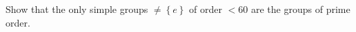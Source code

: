 \begin{problem}
  Show that the only simple groups \(\neq\left\{e\right\}\) of order
  \(<60\) are the groups of prime order.
\end{problem}
\begin{solution}
\end{solution}

